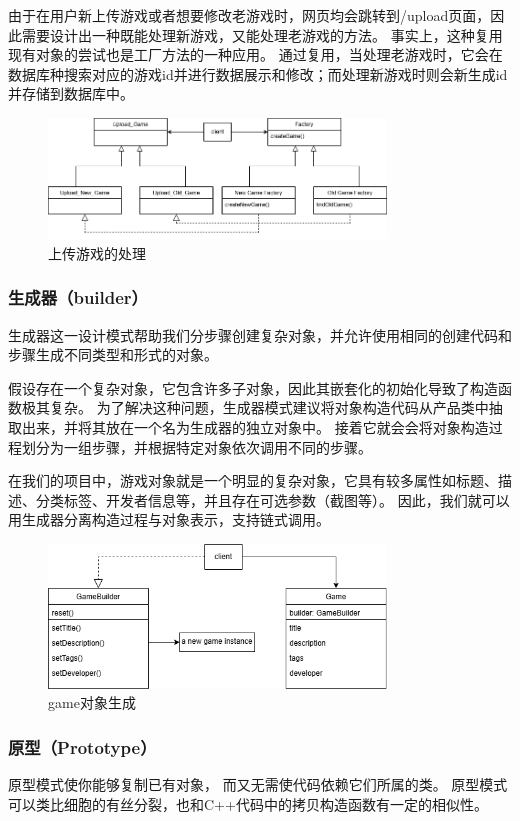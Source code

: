 \documentclass[12pt]{ctexart} %
\begin{document}
由于在用户新上传游戏或者想要修改老游戏时，网页均会跳转到/upload页面，因此需要设计出一种既能处理新游戏，又能处理老游戏的方法。
事实上，这种复用现有对象的尝试也是工厂方法的一种应用。
通过复用，当处理老游戏时，它会在数据库种搜索对应的游戏id并进行数据展示和修改；而处理新游戏时则会新生成id并存储到数据库中。
\begin{figure}[H]
  \centering
  \includegraphics[width=0.8\textwidth]{factory_2.png}
  \caption{上传游戏的处理}
\end{figure}

\subsubsection{生成器（builder）} 
生成器这一设计模式帮助我们分步骤创建复杂对象，并允许使用相同的创建代码和步骤生成不同类型和形式的对象。

假设存在一个复杂对象，它包含许多子对象，因此其嵌套化的初始化导致了构造函数极其复杂。
为了解决这种问题，生成器模式建议将对象构造代码从产品类中抽取出来，并将其放在一个名为生成器的独立对象中。
接着它就会会将对象构造过程划分为一组步骤，并根据特定对象依次调用不同的步骤。

在我们的项目中，游戏对象就是一个明显的复杂对象，它具有较多属性如标题、描述、分类标签、开发者信息等，并且存在可选参数（截图等）。
因此，我们就可以用生成器分离构造过程与对象表示，支持链式调用。
\begin{figure}[H]
  \centering
  \includegraphics[width=0.8\textwidth]{builder.png}
  \caption{game对象生成}
\end{figure}

\subsubsection{原型（Prototype）} 
原型模式使你能够复制已有对象， 而又无需使代码依赖它们所属的类。
原型模式可以类比细胞的有丝分裂，也和C++代码中的拷贝构造函数有一定的相似性。
\end{document}
